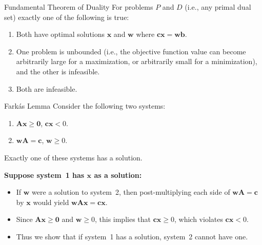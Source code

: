 \begin{theorem}{Fundamental Theorem of Duality}
For problems $P$ and $D$ (i.e., any primal dual set) exactly one of the following is true:
\begin{enumerate}
\item Both have optimal solutions $\mathbf{x}$ and $\mathbf{w}$ where $\mathbf{cx} = \mathbf{wb}$.
\item One problem is unbounded (i.e., the objective function value can become arbitrarily large for a maximization,  or arbitrarily small for a minimization), and the other is infeasible.
\item Both are infeasible.
\end{enumerate}
\end{theorem}



\begin{theorem}{Fark\'as Lemma}
Consider the following two systems:
\begin{enumerate}
\item $\mathbf{Ax} \ge \mathbf{0}$, $\mathbf{cx} < 0$.
\item $\mathbf{wA} = \mathbf{c}$, $\mathbf{w} \ge 0$.
\end{enumerate}
Exactly one of these systems has a solution.
\end{theorem}

\vspace{3mm} {\bf Suppose system~1 has $\mathbf{x}$ as a solution:}
\begin{itemize}
\item If $\mathbf{w}$ were a solution to system~2, then post-multiplying each side of $\mathbf{wA} = \mathbf{c}$ by $\mathbf{x}$ would yield $\mathbf{wAx} = \mathbf{cx}$.
\item Since $\mathbf{Ax} \ge \mathbf{0}$ and $\mathbf{w} \ge 0$, this implies that $\mathbf{cx} \ge 0$, which violates $\mathbf{cx} < 0$.
\item Thus we show that if system~1 has a solution, system~2 cannot have one.
\end{itemize}

